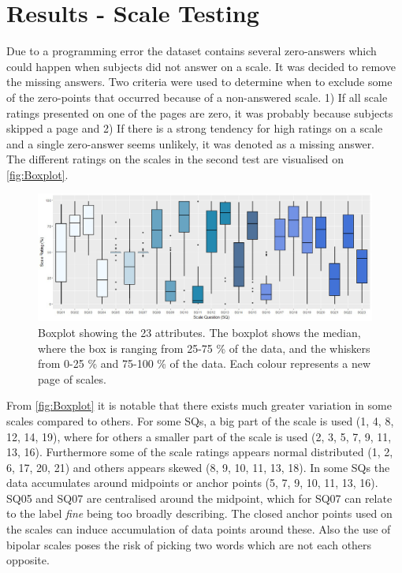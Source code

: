 \section{Results - Scale Testing}
\label{ResultsScaleTesting}
%
Due to a programming error the dataset contains several zero-answers which could happen when subjects did not answer on a scale. It was decided to remove the missing answers. Two criteria were used to determine when to exclude some of the zero-points that occurred because of a non-answered scale. 1) If all scale ratings presented on one of the pages are zero, it was probably because subjects skipped a page and 2) If there is a strong tendency for high ratings on a scale and a single zero-answer seems unlikely, it was denoted as a missing answer.\\

\noindent
The different ratings on the scales in the second test are visualised on \autoref{fig:Boxplot}.
%
%

\begin{figure}[!b]
	\centering
	\includegraphics[width=6.9in]{Figure/Boksplot23.png}
	\hfil
	\caption{Boxplot showing the 23 attributes. The boxplot shows the median, where the box is ranging from 25-75 \% of the data, and the whiskers from 0-25 \% and 75-100 \% of the data. Each colour represents a new page of scales.}
	\label{fig:Boxplot}	
\end{figure}
%
From \autoref{fig:Boxplot} it is notable that there exists much greater variation in some scales compared to others. For some SQs, a big part of the scale is used (1, 4, 8, 12, 14, 19), where for others a smaller part of the scale is used (2, 3, 5, 7, 9, 11, 13, 16). Furthermore some of the scale ratings appears normal distributed (1, 2, 6, 17, 20, 21) and others appears skewed (8, 9, 10, 11, 13, 18). In some SQs the data accumulates around midpoints or anchor points (5, 7, 9, 10, 11, 13, 16). SQ05 and SQ07 are centralised around the midpoint, which for SQ07 can relate to the label \textit{fine} being too broadly describing. The closed anchor points used on the scales can induce accumulation of data points around these. Also the use of bipolar scales poses the risk of picking two words which are not  each others opposite.

